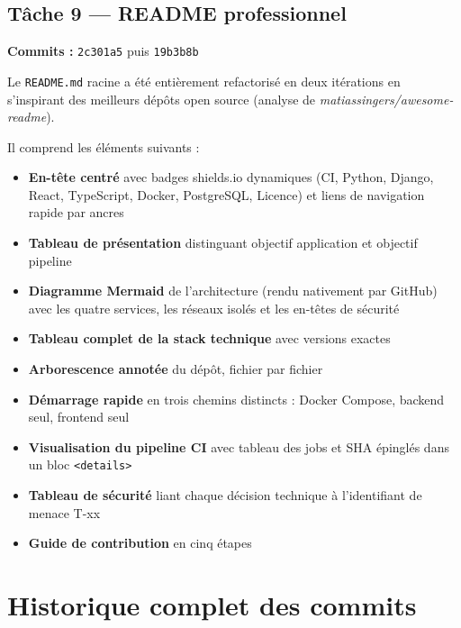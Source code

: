 \documentclass[11pt,a4paper]{article}
\begin{document}
\subsection{Tâche 9 --- README professionnel}

\textbf{Commits :} \texttt{2c301a5} puis \texttt{19b3b8b}

Le \texttt{README.md} racine a été entièrement refactorisé en deux itérations en s'inspirant
des meilleurs dépôts open source (analyse de \textit{matiassingers/awesome-readme}).

Il comprend les éléments suivants :

\begin{itemize}
  \item \textbf{En-tête centré} avec badges shields.io dynamiques (CI, Python, Django, React,
    TypeScript, Docker, PostgreSQL, Licence) et liens de navigation rapide par ancres
  \item \textbf{Tableau de présentation} distinguant objectif application et objectif pipeline
  \item \textbf{Diagramme Mermaid} de l'architecture (rendu nativement par GitHub) avec les
    quatre services, les réseaux isolés et les en-têtes de sécurité
  \item \textbf{Tableau complet de la stack technique} avec versions exactes
  \item \textbf{Arborescence annotée} du dépôt, fichier par fichier
  \item \textbf{Démarrage rapide} en trois chemins distincts : Docker Compose, backend seul,
    frontend seul
  \item \textbf{Visualisation du pipeline CI} avec tableau des jobs et SHA épinglés dans
    un bloc \texttt{<details>}
  \item \textbf{Tableau de sécurité} liant chaque décision technique à l'identifiant de
    menace T-xx
  \item \textbf{Guide de contribution} en cinq étapes
\end{itemize}

\section{Historique complet des commits}
\end{document}
